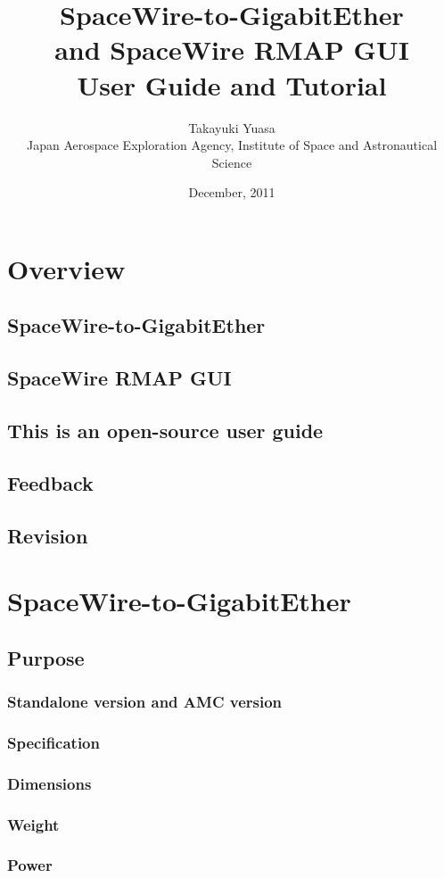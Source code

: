 \documentclass[a4paper,twoside,12pt]{book}
\title{\Huge{
SpaceWire-to-GigabitEther\\
and SpaceWire RMAP GUI}\\
\Large{User Guide and Tutorial
}}
\author{
{\Large
Takayuki Yuasa
}\\
{\small Japan Aerospace Exploration Agency, Institute of Space and Astronautical Science}\\
}
\date{December, 2011}
\begin{document}
\maketitle

\setcounter{page}{2}


\chapter{Overview}
\section{SpaceWire-to-GigabitEther}
\section{SpaceWire RMAP GUI}
\section{This is an open-source user guide}
\section{Feedback}
\section{Revision}

\chapter{SpaceWire-to-GigabitEther}
\section{Purpose}
\subsection{Standalone version and AMC version}
\subsection{Specification}
\subsection{Dimensions}
\subsection{Weight}
\subsection{Power}
\end{document}
